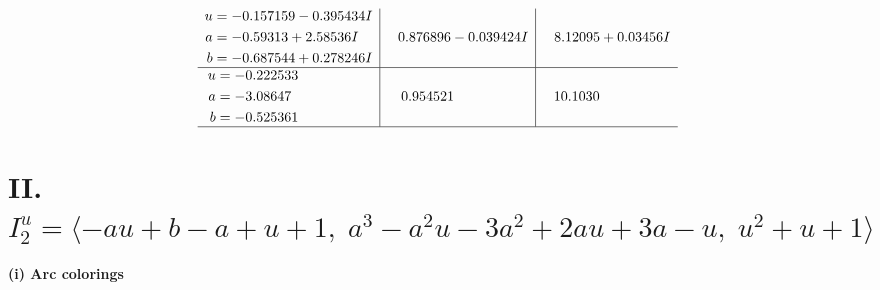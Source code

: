 \documentclass[1p]{elsarticle_modified}
\theoremstyle{definition}
\begin{document}
$$\begin{array}{c|c|c}
\begin{aligned}
u &= -0.157159 - 0.395434 I \\
a &= -0.59313 + 2.58536 I \\
b &= -0.687544 + 0.278246 I\end{aligned}
 & \phantom{-}0.876896 - 0.039424 I & \phantom{-}8.12095 + 0.03456 I \\ \hline\begin{aligned}
u &= -0.222533\phantom{ +0.000000I} \\
a &= -3.08647\phantom{ +0.000000I} \\
b &= -0.525361\phantom{ +0.000000I}\end{aligned}
 & \phantom{-}0.954521\phantom{ +0.000000I} & \phantom{-}10.1030\phantom{ +0.000000I}\\
 \hline 
 \end{array}$$\newpage\newpage\renewcommand{\arraystretch}{1}
\centering \section*{II. $I^u_{2}= \langle - a u+b- a+u+1,\;a^3- a^2 u-3 a^2+2 a u+3 a- u,\;u^2+u+1 \rangle$}
\flushleft \textbf{(i) Arc colorings}\\
\end{document}
